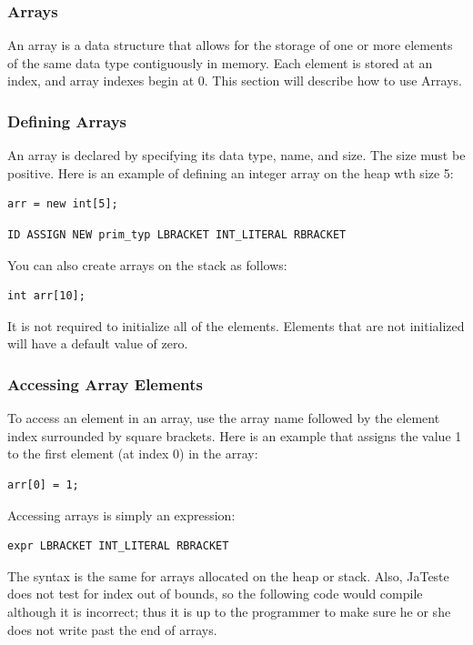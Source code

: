 \documentclass{article}
\begin{document}
\subsubsection{Arrays}
An array is a data structure that allows for the storage of one or more elements of the same data type contiguously in memory. Each element is stored at an index, and array indexes begin at 0. This section will describe how to use Arrays.

\subsubsection{Defining Arrays}
An array is declared by specifying its data type, name, and size. The size must be positive. Here is an example of defining an integer array on the heap wth size 5:

 \begin{lstlisting}
arr = new int[5];
\end{lstlisting}

\begin{Verbatim}[frame=single]
ID ASSIGN NEW prim_typ LBRACKET INT_LITERAL RBRACKET
\end{Verbatim}

You can also create arrays on the stack as follows:

 \begin{lstlisting}
int arr[10];
\end{lstlisting}

It is not required to initialize all of the elements. Elements that are not initialized will have a default value of zero.

\subsubsection{Accessing Array Elements}
To access an element in an array, use the array name followed by the element index surrounded by square brackets. Here is an example that assigns the value 1 to the first element (at index 0) in the array:

 \begin{lstlisting}
arr[0] = 1;
\end{lstlisting}

Accessing arrays is simply an expression:
\begin{Verbatim}[frame=single]
 expr LBRACKET INT_LITERAL RBRACKET 
\end{Verbatim}

The syntax is the same for arrays allocated on the heap or stack. Also, JaTeste does not test for index out of bounds, so the following code would compile although it is incorrect; thus it is up to the programmer to make sure he or she does not write past the end of arrays. 
\end{document}
